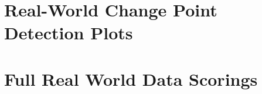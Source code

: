 \documentclass{uvamscse}	%
\begin{document}
\chapter{Real-World Change Point Detection Plots}
\label{changeplots}




\chapter{Full Real World Data Scorings}
\label{fullscores}



\end{document}
